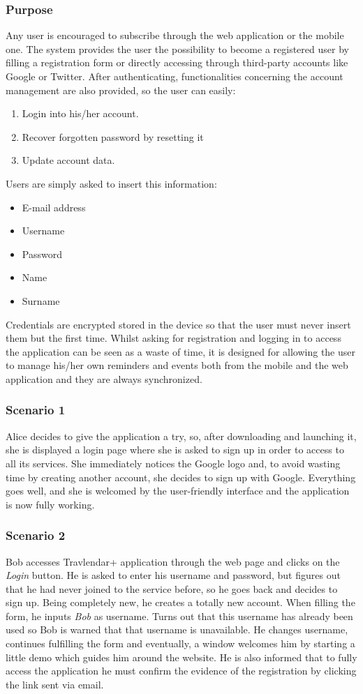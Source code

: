 \subsubsection{Purpose}
Any user is encouraged to subscribe through the web application or the mobile one. The system provides the user the possibility to become a registered user by filling a registration form or directly accessing through third-party accounts like Google or Twitter. After authenticating, functionalities concerning the account management are also provided, so the user can easily:
\begin{enumerate}
	\item Login into his/her account.
    \item Recover forgotten password by resetting it
    \item Update account data.
\end{enumerate}
Users are simply asked to insert this information:
\begin{itemize}
	\item E-mail address
	\item Username
	\item Password
    \item Name
    \item Surname
\end{itemize}
Credentials are encrypted stored in the device so that the user must never insert them but the first time. Whilst asking for registration and logging in to access the application can be seen as a waste of time, it is designed for allowing the user to manage his/her own reminders and events both from the mobile and the web application and they are always synchronized.
\subsubsection{Scenario 1}
Alice decides to give the application a try, so, after downloading and launching it, she is displayed a login page where she is asked to sign up in order to access to all its services. She immediately notices the Google logo and, to avoid wasting time by creating another account, she decides to sign up with Google. Everything goes well, and she is welcomed by the user-friendly interface and the application is now fully working.
\subsubsection{Scenario 2}
Bob accesses Travlendar+ application through the web page and clicks on the \textit{Login} button. He is asked to enter his username and password, but figures out that he had never joined to the service before, so he goes back and decides to sign up. Being completely new, he creates a totally new account. When filling the form, he inputs \textit{Bob} as username. Turns out that this username has already been used so Bob is warned that that username is unavailable. He changes username, continues fulfilling the form and eventually, a window welcomes him by starting a little demo which guides him around the website. He is also informed that to fully access the application he must confirm the evidence of the registration by clicking the link sent via email.
